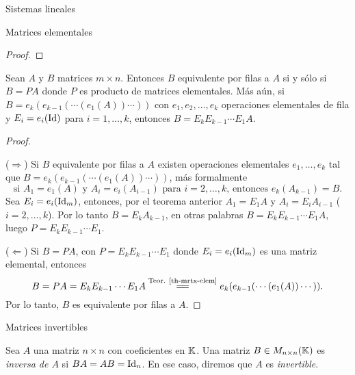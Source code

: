 \begin{chapter}{Sistemas lineales}
\begin{section}{Matrices elementales}
\begin{proof}
    
            \end{proof}
            
            
            
            
            \begin{corolario}\label{coro-mrtx-elem}
                Sean $A$ y $B$ matrices $m \times n$. Entonces $B$ equivalente por filas a $A$ si y sólo si $B=PA$ donde $P$ es  producto de matrices elementales. Más aún, si $B = e_k(e_{k-1}(\cdots(e_1(A))\cdots))$ con $e_1,e_2,\ldots,e_k$ operaciones elementales de fila y $E_i=e_i(\operatorname{Id})$ para $i=1,\ldots,k$,  entonces $B =  E_kE_{k-1}\cdots E_1A$.
            \end{corolario}
            \begin{proof} 
                \
                
                ($\Rightarrow$) Si $B$ equivalente por filas a $A$  existen operaciones elementales $e_1,\ldots,e_k$ tal que $B = e_k(e_{k-1}(\cdots(e_1(A))\cdots))$, más formalmente
                \begin{equation*}
                \text{si } A_1 = e_1(A)\text{ y } A_i = e_i(A_{i-1})\text{ para }i=2,\ldots,k\text{, entonces } e_k(A_{k-1})= B.
                \end{equation*}
                Sea $E_i = e_i(\operatorname{Id}_m)$, entonces, por el teorema anterior $A_1= E_1A$ y $A_i = E_iA_{i-1}$ ($i=2,\ldots,k$). Por  lo tanto $B=E_kA_{k-1}$, en otras palabras $B =  E_kE_{k-1}\cdots E_1A$, luego $P = E_kE_{k-1}\cdots E_1$.
                
                ($\Leftarrow$) Si $B= PA$, con  $P = E_kE_{k-1}\cdots E_1$ donde $E_i=e_i(\operatorname{Id}_m)$ es una matriz elemental,  entonces
                $$
                B = PA = E_kE_{k-1}\cdots E_1A \stackrel{\text{Teor. \ref{th-mrtx-elem}}}{=\joinrel=}  e_k(e_{k-1}(\cdots(e_1(A))\cdots)). 
                $$
                Por lo tanto, $B$ es equivalente por filas a $A$.
            \end{proof} 
            
        \end{section}
        
        \begin{section}{Matrices invertibles}\label{seccion-matrices-invertibles}
            \begin{definicion} Sea $A$ una  matriz $n \times n$ con coeficientes en $\mathbb K$. Una matriz $B \in M_{n\times n}(\mathbb K)$  es \textit{inversa  de $A$} si $BA=AB=\operatorname{Id}_n$. En  ese caso,  diremos que  $A$ es \textit{invertible}.
            \end{definicion}
            

\end{section}
\end{chapter}
